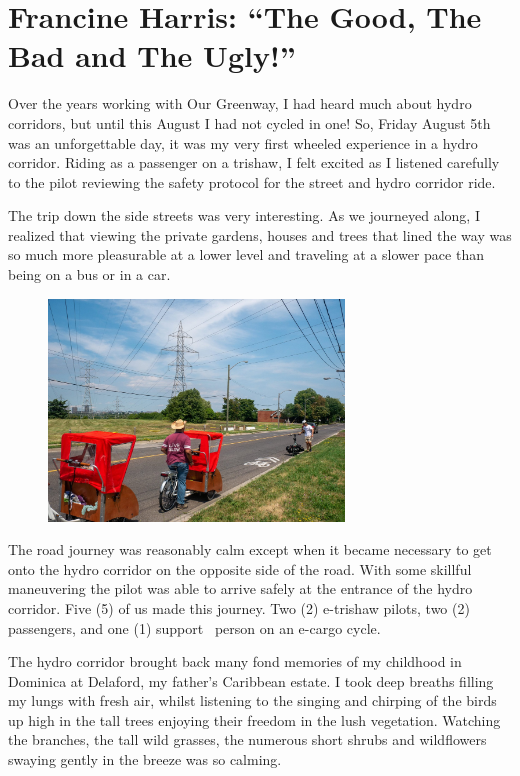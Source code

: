 \documentclass[letter]{ourGreenwayBrand}
\begin{document}
\section{Francine Harris: “The Good, The Bad and The Ugly!”}
Over the years working with Our Greenway, I had heard much about hydro corridors, but until this August I had not cycled in one! So, Friday August 5th was an unforgettable day, it was my very first wheeled experience in a hydro corridor. Riding as a passenger on a trishaw, I felt excited as I listened carefully to the pilot reviewing the safety protocol for the street and hydro corridor ride.

The trip down the side streets was very interesting. As we journeyed along, I realized that viewing the private gardens, houses and trees that lined the way was so much more pleasurable at a lower level and traveling at a slower pace than being on a bus or in a car.

\begin{figure}[htbp]
  \centering
  \includegraphics[width=0.7\textwidth]{images/1220518-2048x1538.jpg}
\end{figure}

The road journey was reasonably calm except when it became necessary to get onto the hydro corridor on the opposite side of the road. With some skillful maneuvering the pilot was able to arrive safely at the entrance of the hydro corridor. Five (5) of us made this journey. Two (2) e-trishaw pilots, two (2) passengers, and one (1) support  person on an e-cargo cycle.

The hydro corridor brought back many fond memories of my childhood in Dominica at Delaford, my father’s Caribbean estate. I took deep breaths filling my lungs with fresh air, whilst listening to the singing and chirping of the birds up high in the tall trees enjoying their freedom in the lush vegetation. Watching the branches, the tall wild grasses, the numerous short shrubs and wildflowers swaying gently in the breeze was so calming.
\end{document}
